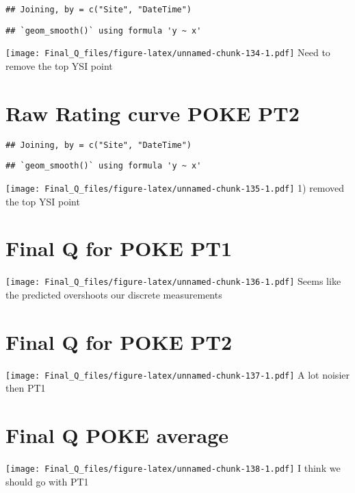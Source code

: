 \documentclass[
]{article}
\begin{document}
\begin{verbatim}
## Joining, by = c("Site", "DateTime")
\end{verbatim}

\begin{verbatim}
## `geom_smooth()` using formula 'y ~ x'
\end{verbatim}

\texttt{[image: Final\_Q\_files/figure-latex/unnamed-chunk-134-1.pdf]}
Need to remove the top YSI point

\hypertarget{raw-rating-curve-poke-pt2-1}{%
\section{Raw Rating curve POKE PT2}\label{raw-rating-curve-poke-pt2-1}}

\begin{verbatim}
## Joining, by = c("Site", "DateTime")
\end{verbatim}

\begin{verbatim}
## `geom_smooth()` using formula 'y ~ x'
\end{verbatim}

\texttt{[image: Final\_Q\_files/figure-latex/unnamed-chunk-135-1.pdf]} 1)
removed the top YSI point

\hypertarget{final-q-for-poke-pt1}{%
\section{Final Q for POKE PT1}\label{final-q-for-poke-pt1}}

\texttt{[image: Final\_Q\_files/figure-latex/unnamed-chunk-136-1.pdf]}
Seems like the predicted overshoots our discrete measurements

\hypertarget{final-q-for-poke-pt2}{%
\section{Final Q for POKE PT2}\label{final-q-for-poke-pt2}}

\texttt{[image: Final\_Q\_files/figure-latex/unnamed-chunk-137-1.pdf]} A
lot noisier then PT1

\hypertarget{final-q-poke-average}{%
\section{Final Q POKE average}\label{final-q-poke-average}}

\texttt{[image: Final\_Q\_files/figure-latex/unnamed-chunk-138-1.pdf]} I
think we should go with PT1
\end{document}
